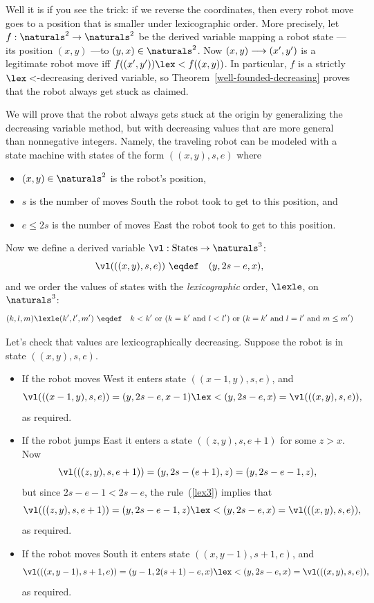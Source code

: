Well it is if you see the trick: if we reverse the coordinates, then every
robot move goes to a position that is smaller under lexicographic order.
More precisely, let $f:\naturals^2 \to \naturals^2$ be the derived variable
mapping a robot state ---its position $(x,y)$ ---to $(y,x) \in
\naturals^2$.  Now $(x,y)\mathrel{\longrightarrow} (x',y')$ is a legitimate robot move iff
$f((x',y')) \lex< f((x,y))$.  In particular, $f$ is a strictly
$\lex<$-decreasing derived variable, so
Theorem~\ref{well-founded-decreasing} proves that the robot always get
stuck as claimed.
\fi



\iffalse

We will prove that the robot always gets stuck at the origin by
generalizing the decreasing variable method, but with decreasing values
that are more general than nonnegative integers.  Namely, the traveling robot
can be modeled with a state machine with states of the form $((x,y),s,e)$
where
\begin{itemize}
\item $(x,y) \in \naturals^2$ is the robot's position,
\item $s$ is the number of moves South the robot took to get to this
position, and
\item $e \le 2s$ is the number of moves East the robot took to get to this
position. 
\end{itemize}

Now we define a derived variable $\vl:\text{States}\to \naturals^3$:
\[
\vl(((x,y),s,e)) \ \eqdef\quad (y,2s-e,x),
\]
and we order the values of states with the \emph{lexicographic} order,
$\lexle$, on $\naturals^3$:
\begin{equation}\label{lex3}
(k,l,m) \lexle (k',l',m') \ \eqdef\quad k < k' \text{ or } (k=k' \text{
and } l < l') \text{ or } (k=k' \text{ and } l = l' \text{ and } m \le m')
\end{equation}

Let's check that values are lexicographically decreasing.  Suppose the
robot is in state $((x,y),s,e)$.
\begin{itemize}
\item If the robot moves West it enters state $((x-1,y),s,e)$, and
\[
\vl(((x-1,y),s,e)) = (y,2s-e,x-1) \lex< (y,2s-e,x) = \vl(((x,y),s,e)),
\]
as required.


\item If the robot jumps East it enters a state $((z,y),s,e+1)$ for some
$z>x$.  Now
\[
\vl(((z,y),s,e+1)) = (y,2s-(e+1),z) = (y,2s-e-1,z),
\]
but since $2s-e-1 < 2s-e$, the rule~(\ref{lex3}) implies that
\[
\vl(((z,y),s,e+1)) = (y,2s-e-1,z)  \lex< (y,2s-e,x) = \vl(((x,y),s,e)),
\]
as required.

\item If the robot moves South it enters state $((x,y-1),s+1,e)$, and
\[
\vl(((x,y-1),s+1,e)) = (y-1,2(s+1)-e,x) \lex< (y,2s-e,x) = \vl(((x,y),s,e)),
\]
as required.

\end{itemize}

